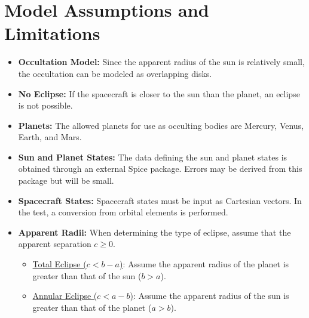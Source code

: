 \section{Model Assumptions and Limitations}
\begin{itemize}
	\item \textbf{Occultation Model:} Since the apparent radius of the sun is relatively small, the occultation can be modeled as overlapping disks.
	\item \textbf{No Eclipse:} If the spacecraft is closer to the sun than the planet, an eclipse is not possible.
	\item \textbf{Planets:} The allowed planets for use as occulting bodies are Mercury, Venus, Earth, and Mars.
	\item \textbf{Sun and Planet States:} The data defining the sun and planet states is obtained through an external Spice package. Errors may be derived from this package but will be small.
	\item \textbf{Spacecraft States:} Spacecraft states must be input as Cartesian vectors. In the test, a conversion from orbital elements is performed.
	\item \textbf{Apparent Radii:}
	When determining the type of eclipse, assume that the apparent separation $c \geq 0$.
	\begin{itemize}
		\item \underline{Total Eclipse ($c<b-a$)}:
		Assume the apparent radius of the planet is greater than that of the sun ($b>a$).
		\item \underline{Annular Eclipse ($c<a-b$)}:
		Assume the apparent radius of the sun is greater than that of the planet ($a>b$).
	\end{itemize}
\end{itemize}